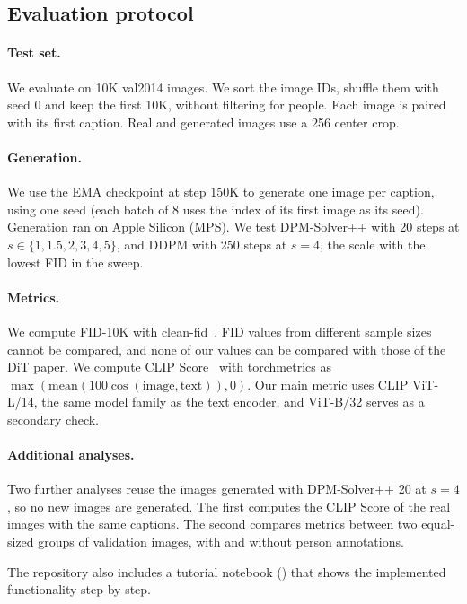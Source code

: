 \documentclass{article}
\begin{document}
\subsection{Evaluation protocol}

\paragraph{Test set.}
We evaluate on 10K val2014 images.
We sort the image IDs, shuffle them with seed 0 and keep the first 10K, without filtering for people.
Each image is paired with its first caption.
Real and generated images use a 256 center crop.

\paragraph{Generation.}
We use the EMA checkpoint at step 150K to generate one image per caption, using one seed (each batch of 8 uses the index of its first image as its seed).
Generation ran on Apple Silicon (MPS).
We test DPM-Solver++ with 20 steps at $s\in\{1,1.5,2,3,4,5\}$, and DDPM with 250 steps at $s=4$, the scale with the lowest FID in the sweep.

\paragraph{Metrics.}
We compute FID-10K with clean-fid~\cite{parmar2022cleanfid}.
FID values from different sample sizes cannot be compared, and none of our values can be compared with those of the DiT paper.
We compute CLIP Score~\cite{hessel2021clipscore} with torchmetrics as $\max(\mathrm{mean}(100\cos(\mathrm{image},\mathrm{text})),0)$.
Our main metric uses CLIP ViT-L/14, the same model family as the text encoder, and ViT-B/32 serves as a secondary check.

\paragraph{Additional analyses.}
Two further analyses reuse the images generated with DPM-Solver++ 20 at $s=4$, so no new images are generated.
The first computes the CLIP Score of the real images with the same captions.
The second compares metrics between two equal-sized groups of validation images, with and without person annotations.

The repository also includes a tutorial notebook () that shows the implemented functionality step by step.
\end{document}
